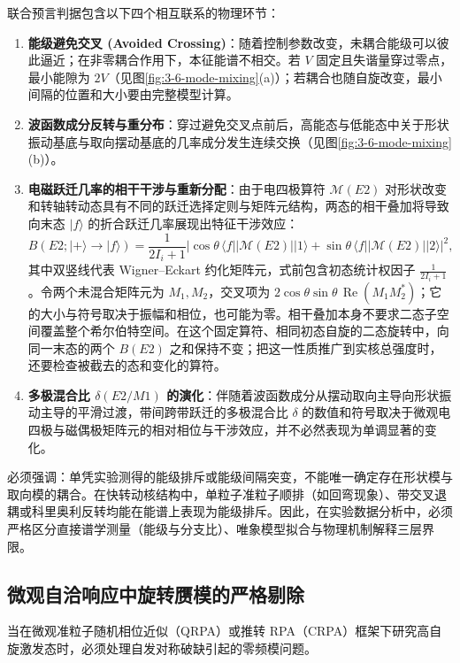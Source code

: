 联合预言判据包含以下四个相互联系的物理环节：
\begin{enumerate}
\item \textbf{能级避免交叉 (Avoided Crossing)}：随着控制参数改变，未耦合能级可以彼此逼近；在非零耦合作用下，本征能谱不相交。若 $V$ 固定且失谐量穿过零点，最小能隙为 $2V$（见图\ref{fig:3-6-mode-mixing}(a)）；若耦合也随自旋改变，最小间隔的位置和大小要由完整模型计算。
\item \textbf{波函数成分反转与重分布}：穿过避免交叉点前后，高能态与低能态中关于形状振动基底与取向摆动基底的几率成分发生连续交换（见图\ref{fig:3-6-mode-mixing}(b)）。
\item \textbf{电磁跃迁几率的相干干涉与重新分配}：由于电四极算符 $\mathcal{M}(E2)$ 对形状改变和转轴转动态具有不同的跃迁选择定则与矩阵元结构，两态的相干叠加将导致向末态 $|f\rangle$ 的折合跃迁几率展现出特征干涉效应：
\begin{equation}\label{eq:3-6-be2-interference}
B(E2; |+\rangle \to |f\rangle) = \frac{1}{2I_i + 1} \left| \cos\theta\,\langle f || \mathcal{M}(E2) || 1 \rangle + \sin\theta\,\langle f || \mathcal{M}(E2) || 2 \rangle \right|^2 ,
\end{equation}
其中双竖线代表 Wigner--Eckart 约化矩阵元，式前包含初态统计权因子 $\frac{1}{2I_i+1}$。令两个未混合矩阵元为 $M_1,M_2$，交叉项为 $2\cos\theta\sin\theta\,\operatorname{Re}(M_1M_2^*)$；它的大小与符号取决于振幅和相位，也可能为零。相干叠加本身不要求二态子空间覆盖整个希尔伯特空间。在这个固定算符、相同初态自旋的二态旋转中，向同一末态的两个 $B(E2)$ 之和保持不变；把这一性质推广到实核总强度时，还要检查被截去的态和变化的算符。
\item \textbf{多极混合比 $\delta(E2/M1)$ 的演化}：伴随着波函数成分从摆动取向主导向形状振动主导的平滑过渡，带间跨带跃迁的多极混合比 $\delta$ 的数值和符号取决于微观电四极与磁偶极矩阵元的相对相位与干涉效应，并不必然表现为单调显著的变化。
\end{enumerate}

必须强调：单凭实验测得的能级排斥或能级间隔突变，不能唯一确定存在形状模与取向模的耦合。在快转动核结构中，单粒子准粒子顺排（如回弯现象）、带交叉退耦或科里奥利反转均能在能谱上表现为能级排斥。因此，在实验数据分析中，必须严格区分直接谱学测量（能级与分支比）、唯象模型拟合与物理机制解释三层界限。

\subsection{微观自洽响应中旋转赝模的严格剔除}\label{sec:3-6-4}

当在微观准粒子随机相位近似（QRPA）或推转 RPA（CRPA）框架下研究高自旋激发态时，必须处理自发对称破缺引起的零频模问题。\cite{prochniak-rohozinski-2009-bohr-collective-hamiltonian,matsuzaki-2004-nuclear-inertia-and-wobbling}

